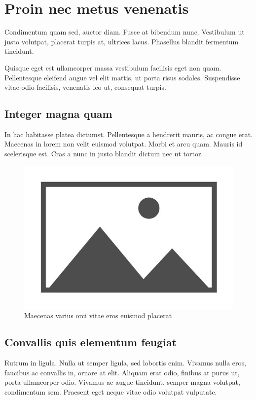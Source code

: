 \section{Proin nec metus venenatis} \label{sec:proin}

Condimentum quam sed, auctor diam. Fusce at bibendum nunc. Vestibulum ut justo
volutpat, placerat turpis at, ultrices lacus. Phasellus blandit fermentum tincidunt.

Quisque eget est ullamcorper massa vestibulum facilisis eget non quam. Pellentesque
eleifend augue vel elit mattis, ut porta risus sodales. Suspendisse vitae odio
facilisis, venenatis leo ut, consequat turpis.

\subsection{Integer magna quam}

In hac habitasse platea dictumst. Pellentesque a hendrerit mauris, ac congue
erat. Maecenas in lorem non velit euismod volutpat. Morbi et arcu quam. Mauris
id scelerisque est. Cras a nunc in justo blandit dictum nec ut tortor.

\begin{figure}[hb]
\centering\includegraphics[scale=1]{book/images/placeholder.jpg}
\caption{Maecenas varius orci vitae eros euismod placerat} \label{fig:integer}
\end{figure}

\subsection{Convallis quis elementum feugiat}

Rutrum in ligula. Nulla ut semper ligula, sed lobortis enim. Vivamus nulla eros,
faucibus ac convallis in, ornare at elit. Aliquam erat odio, finibus at purus ut,
porta ullamcorper odio. Vivamus ac augue tincidunt, semper magna volutpat,
condimentum sem. Praesent eget neque vitae odio volutpat vulputate.
